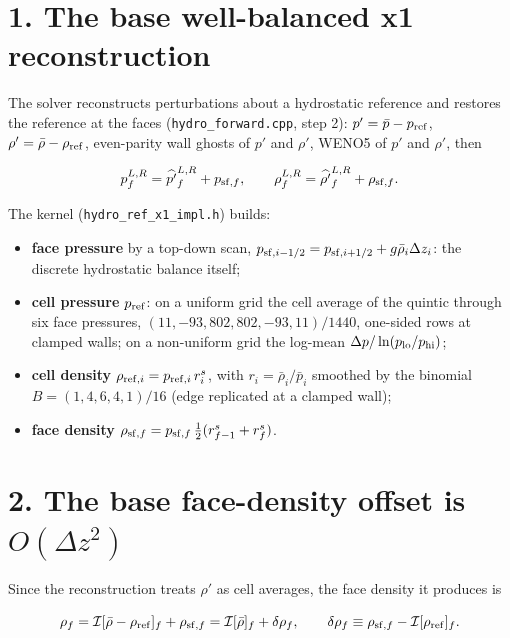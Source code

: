 \documentclass[11pt,a4paper]{article}
\begin{document}
\section*{1. The base well-balanced x1 reconstruction}

The solver reconstructs perturbations about a hydrostatic reference and restores the reference at the faces
(\texttt{hydro\_forward.cpp}, step 2): $p' = \bar p - p_{\rm ref}$, $\rho' = \bar\rho - \rho_{\rm ref}$, even-parity
wall ghosts of $p'$ and $\rho'$, WENO5 of $p'$ and $\rho'$, then

\begin{equation*}
p^{L,R}_f = \widehat{p'}^{L,R}_f + p_{{\rm sf},f}, \qquad \rho^{L,R}_f = \widehat{\rho'}^{L,R}_f + \rho_{{\rm sf},f} .
\end{equation*}

The kernel (\texttt{hydro\_ref\_x1\_impl.h}) builds:

\begin{itemize}
\item \textbf{face pressure} by a top-down scan, $p_{{\rm sf},i-1/2} = p_{{\rm sf},i+1/2} + g\bar\rho_i\Delta z_i$: the
  discrete hydrostatic balance itself;
\item \textbf{cell pressure} $p_{\rm ref}$: on a uniform grid the cell average of the quintic through six face
  pressures, $(11, -93, 802, 802, -93, 11)/1440$, one-sided rows at clamped walls; on a non-uniform grid the
  log-mean $\Delta p / \ln(p_{\rm lo}/p_{\rm hi})$;
\item \textbf{cell density} $\rho_{{\rm ref},i} = p_{{\rm ref},i}\, r^s_i$, with $r_i = \bar\rho_i/\bar p_i$ smoothed by the
  binomial $B = (1, 4, 6, 4, 1)/16$ (edge replicated at a clamped wall);
\item \textbf{face density} $\rho_{{\rm sf},f} = p_{{\rm sf},f}\,\tfrac12(r^s_{f-1} + r^s_f)$.
\end{itemize}

\section*{2. The base face-density offset is $O(\Delta z^2)$}

Since the reconstruction treats $\rho'$ as cell averages, the face density it produces is

\begin{equation*}
\rho_f = \mathcal I[\bar\rho - \rho_{\rm ref}]_f + \rho_{{\rm sf},f} = \mathcal I[\bar\rho]_f + \delta\rho_f,
\qquad \delta\rho_f \equiv \rho_{{\rm sf},f} - \mathcal I[\rho_{\rm ref}]_f .
\end{equation*}
\end{document}
